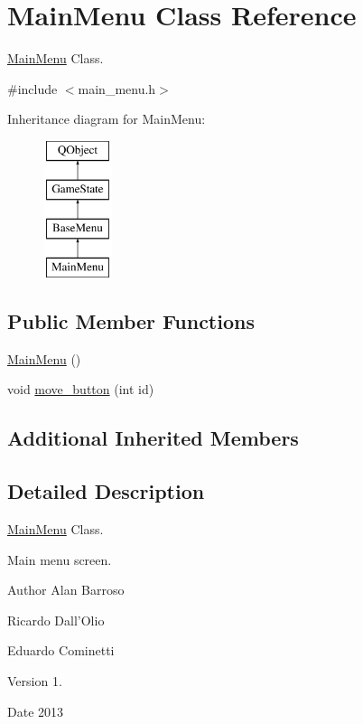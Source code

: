 \hypertarget{class_main_menu}{\section{Main\-Menu Class Reference}
\label{class_main_menu}
}


\hyperlink{class_main_menu}{Main\-Menu} Class.  




{\ttfamily \#include $<$main\-\_\-menu.\-h$>$}

Inheritance diagram for Main\-Menu\-:\begin{figure}[H]
\begin{center}
\leavevmode
\includegraphics[height=4.000000cm]{class_main_menu}
\end{center}
\end{figure}
\subsection*{Public Member Functions}
\begin{DoxyCompactItemize}
\item 
\hyperlink{class_main_menu_a53eecf9d5ffd094f54ac4193e7e57eaf}{Main\-Menu} ()
\item 
void \hyperlink{class_main_menu_a44b82a9130ddaa6e5237303290fc1b67}{move\-\_\-button} (int id)
\end{DoxyCompactItemize}
\subsection*{Additional Inherited Members}


\subsection{Detailed Description}
\hyperlink{class_main_menu}{Main\-Menu} Class. 

Main menu screen. \begin{DoxyAuthor}{Author}
Alan Barroso 

Ricardo Dall'Olio 

Eduardo Cominetti 
\end{DoxyAuthor}
\begin{DoxyVersion}{Version}
1. 
\end{DoxyVersion}
\begin{DoxyDate}{Date}
2013 
\end{DoxyDate}


